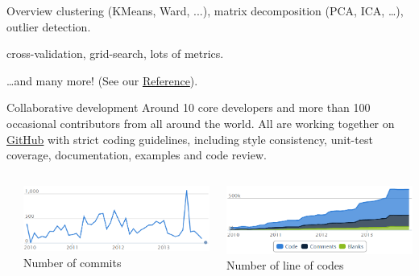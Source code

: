 \documentclass[final]{beamer}
\begin{document}
\begin{frame}[fragile]
\begin{textblock}{0.32}
\begin{block}{Overview \phantom{p}}
\textbf{} clustering (KMeans, Ward, ...),
matrix decomposition (PCA, ICA, \ldots), outlier detection.

\vspace{0.3cm}

\textbf{} cross-validation,
grid-search, lots of metrics.

\vspace{0.3cm}

\ldots and many more! (See our
\href{http://scikit-learn.org/stable/modules/classes.html}{Reference}).
\end{block}

\begin{block}{Collaborative development \phantom{p}}
Around 10 core developers
and more than 100 occasional contributors from all around the world.
All are working together on
\href{https://github.com/scikit-learn/scikit-learn}{GitHub} with strict coding
guidelines, including style consistency, unit-test coverage, documentation,
examples and code review.

\begin{columns}[b]
\begin{column}{0.01\textwidth}
\end{column}
\begin{column}{0.485\textwidth}
\begin{center}
\includegraphics[width=\textwidth]{commits} \\
Number of commits\end{center}
\end{column}
\begin{column}{0.485\textwidth}
\begin{center}
\includegraphics[width=\textwidth]{loc} \\
Number of line of codes
\end{center}
\end{column}
\end{columns}


\end{block}
\end{textblock}
\end{frame}
\end{document}
